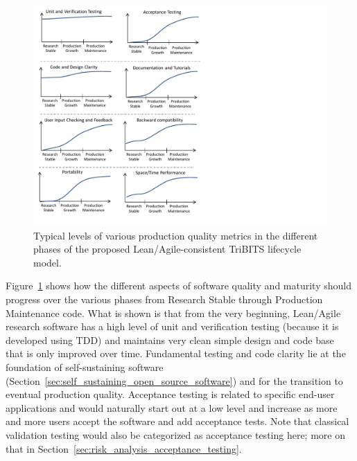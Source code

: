 \documentclass[11pt]{SANDreport}
\begin{document}
\begin{figure}
\begin{center}
\includegraphics[trim = 0.1in 0.1in 4.0in 0.1in, scale=0.85]
{ImprovementsInDevelopmentPhases}
{}\caption{Typical levels of various production quality metrics in the
different phases of the proposed Lean/Agile-consistent TriBITS
lifecycle model.}
\label{fig:ImprovementsInDevelopmentPhases}
\end{center}
\end{figure}

Figure~\ref{fig:ImprovementsInDevelopmentPhases} shows how the
different aspects of software quality and maturity should progress
over the various phases from Research Stable through Production
Maintenance code.  What is shown is that from the very beginning,
Lean/Agile research software has a high level of unit and verification
testing (because it is developed using TDD) and maintains very clean
simple design and code base that is only improved over time.
Fundamental testing and code clarity lie at the foundation of
self-sustaining software
(Section~\ref{sec:self_sustaining_open_source_software}) and for the
transition to eventual production quality.  Acceptance testing is
related to specific end-user applications and would naturally start
out at a low level and increase as more and more users accept the
software and add acceptance tests.  Note that classical validation
testing would also be categorized as acceptance testing here; more on
that in Section~\ref{sec:risk_analysis_acceptance_testing}.
\end{document}
